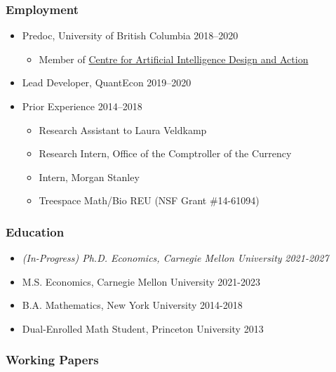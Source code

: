 \documentclass[12pt]{article}   %
\begin{document}
\subsubsection*{Employment}
\begin{itemize}
  \item Predoc, University of British Columbia \hfill 2018--2020
  \begin{itemize} \small
    \item Member of \href{https://caida.ubc.ca/caida-ubc-icics-centre-artificial-intelligence-decision-making-and-action}{Centre for Artificial Intelligence Design and Action}
  \end{itemize}
  \item Lead Developer, QuantEcon \hfill 2019--2020
  \item Prior Experience \hfill 2014--2018 
  \begin{itemize}\setlength{\leftskip}{1cm}
    \item Research Assistant to Laura Veldkamp
    \item Research Intern, Office of the Comptroller of the Currency
    \item Intern, Morgan Stanley 
    \item Treespace Math/Bio REU (NSF Grant \#14-61094)
  \end{itemize}
\end{itemize}

\subsubsection*{Education}
\begin{itemize}
  \item \textit{(In-Progress) Ph.D. Economics, Carnegie Mellon University} \hfill \emph{2021-2027}
  \item M.S. Economics, Carnegie Mellon University \hfill 2021-2023
  \item B.A. Mathematics, New York University \hfill 2014-2018
  \item Dual-Enrolled Math Student, Princeton University \hfill 2013
\end{itemize} 


\subsubsection*{Working Papers}
\begin{refsection} %
\nocite{NBERw28981}
\hspace*{1.2cm}%
\begin{minipage}{0.9\textwidth}%
  \printbibliography[heading=none, sorting=ynt]
\end{minipage}%
\end{refsection}
\end{document}
